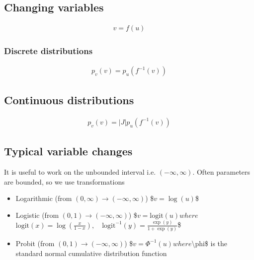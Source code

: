 \documentclass[letterpaper,10pt,english]{jupyterBook}
\begin{document}
\subsection{Changing variables}
\label{\detokenize{Lecture 2:changing-variables}}\begin{equation*}
\begin{split} v=f(u) \end{split}
\end{equation*}

\subsubsection{Discrete distributions}
\label{\detokenize{Lecture 2:discrete-distributions}}\begin{equation*}
\begin{split}
p_v(v)=p_u(f^{-1}(v))
\end{split}
\end{equation*}

\subsection{Continuous distributions}
\label{\detokenize{Lecture 2:continuous-distributions}}\begin{equation*}
\begin{split}
p_v(v)=|J|p_u(f^{-1}(v))
\end{split}
\end{equation*}

\subsection{Typical variable changes}
\label{\detokenize{Lecture 2:typical-variable-changes}}
\sphinxAtStartPar
It is useful to work on the unbounded interval i.e. \((-\infty,\infty)\). Often parameters are bounded, so we use transformations
\begin{itemize}
\item {} 
\sphinxAtStartPar
Logarithmic (from \((0,\infty)\rightarrow (-\infty,\infty)\))
\$\( v=\log(u)\)\$

\item {} 
\sphinxAtStartPar
Logistic (from \((0,1)\rightarrow (-\infty,\infty)\))
\$\( v=\mathrm{logit}(u) \)\(
where 
\)\( \mathrm{logit}(x)=\log\left(\frac{x}{1-x}\right),\quad
\mathrm{logit}^{-1}(y)=\frac{\exp(y)}{1+\exp(y)}\)\$

\item {} 
\sphinxAtStartPar
Probit (from \((0,1)\rightarrow (-\infty,\infty)\))
\$\( v=\Phi^{-1}(u) \)\(
where \)\textbackslash{}phi\$ is the standard normal cumulative distribution function

\end{itemize}
\end{document}
